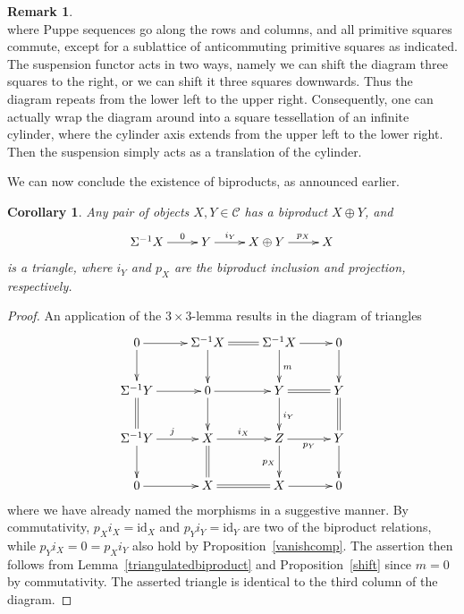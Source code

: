 \documentclass{amsproc}
\newtheorem{cor}[prop]{Corollary}
\theoremstyle{definition}
\newtheorem{rem}[prop]{Remark}
\begin{document}
\begin{rem}
\begin{displaymath}
\end{displaymath}
where Puppe sequences go along the rows and columns, and all primitive squares commute, except for a sublattice of anticommuting primitive squares as indicated. The suspension functor acts in two ways, namely we can shift the diagram three squares to the right, or we can shift it three squares downwards. Thus the diagram repeats from the lower left to the upper right. Consequently, one can actually wrap the diagram around into a square tessellation of an infinite cylinder, where the cylinder axis extends from the upper left to the lower right. Then the suspension simply acts as a translation of the cylinder.
\end{rem}

We can now conclude the existence of biproducts, as announced earlier.

\begin{cor}
\label{biproductsexist}
Any pair of objects $X,Y\in{\mathcal{C}}$ has a biproduct $X\oplus Y$, and
\begin{displaymath}
\xymatrix{{}\Sigma^{-1}X\ar[r]^(.6)0 & Y\ar[r]^(.4){i_Y} & X\oplus Y\ar[r]^(.6){p_X} & X}
\end{displaymath}
is a triangle, where $i_Y$ and $p_X$ are the biproduct inclusion and projection, respectively.
\end{cor}

\begin{proof}
An application of the $3\!\!\times\!\!3$-lemma results in the diagram of triangles
\begin{displaymath}
\xymatrix{0\ar[r]\ar[d] & {}\Sigma^{-1}X\ar@{=}[r]\ar[d] & {}\Sigma^{-1}X\ar[r]\ar[d]^m & 0\ar[d]\\{}
\Sigma^{-1}Y\ar[r]\ar@{=}[d] & 0\ar[r]\ar[d] & Y\ar@{=}[r]\ar[d]^{i_Y} & Y\ar@{=}[d]\\{}
\Sigma^{-1}Y\ar[r]^j\ar[d] & X\ar[r]^{i_X}\ar@{=}[d] & Z\ar[r]_{p_Y}\ar[d]_{p_X} & Y\ar[d]\\
0\ar[r] & X\ar@{=}[r] & X\ar[r] & 0}
\end{displaymath}
where we have already named the morphisms in a suggestive manner. By commutativity, $p_Xi_X={\mathrm{id}}_X$ and $p_Yi_Y={\mathrm{id}}_Y$ are two of the biproduct relations, while $p_Yi_X=0=p_Xi_Y$ also hold by Proposition~\ref{vanishcomp}. The assertion then follows from Lemma~\ref{triangulatedbiproduct} and Proposition~\ref{shift} since $m=0$ by commutativity. The asserted triangle is identical to the third column of the diagram.
\end{proof}
\end{document}
